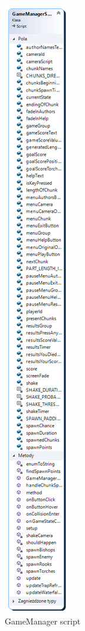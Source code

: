 \documentclass[12pt, english]{article}
\begin{document}
\begin{figure}
	\centering
	\includegraphics[width=\textwidth, height=0.9\textheight, keepaspectratio]{image1.png}
	\caption{GameManager script}
	\label{figure_gamemanagerscript}
\end{figure}
\end{document}
